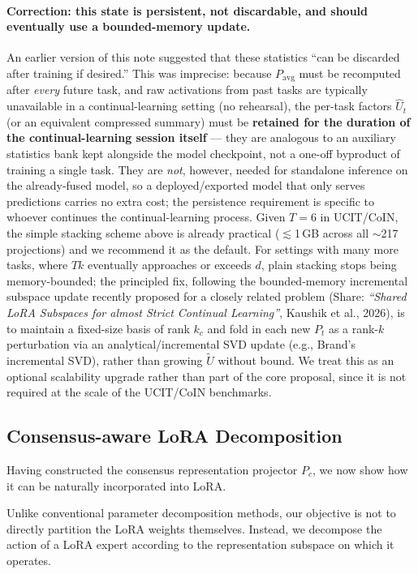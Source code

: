 \documentclass[a4paper]{article}
\begin{document}
\paragraph{Correction: this state is persistent, not discardable, and should eventually use a bounded-memory update.} An earlier version of this note suggested that these statistics ``can be discarded after training if desired.'' This was imprecise: because $P_{\mathrm{avg}}$ must be recomputed after \emph{every} future task, and raw activations from past tasks are typically unavailable in a continual-learning setting (no rehearsal), the per-task factors $\hat U_t$ (or an equivalent compressed summary) must be \textbf{retained for the duration of the continual-learning session itself} — they are analogous to an auxiliary statistics bank kept alongside the model checkpoint, not a one-off byproduct of training a single task. They are \emph{not}, however, needed for standalone inference on the already-fused model, so a deployed/exported model that only serves predictions carries no extra cost; the persistence requirement is specific to whoever continues the continual-learning process. Given $T{=}6$ in UCIT/CoIN, the simple stacking scheme above is already practical ($\lesssim$1\,GB across all $\sim$217 projections) and we recommend it as the default. For settings with many more tasks, where $Tk$ eventually approaches or exceeds $d$, plain stacking stops being memory-bounded; the principled fix, following the bounded-memory incremental subspace update recently proposed for a closely related problem (Share: \emph{``Shared LoRA Subspaces for almost Strict Continual Learning''}, Kaushik et al., 2026), is to maintain a fixed-size basis of rank $k_c$ and fold in each new $P_{t}$ as a rank-$k$ perturbation via an analytical/incremental SVD update (e.g., Brand's incremental SVD), rather than growing $\tilde U$ without bound. We treat this as an optional scalability upgrade rather than part of the core proposal, since it is not required at the scale of the UCIT/CoIN benchmarks.

\subsection{Consensus-aware LoRA Decomposition}

Having constructed the consensus representation projector $P_c$, we now show how it can be naturally incorporated into LoRA.

Unlike conventional parameter decomposition methods, our objective is not to directly partition the LoRA weights themselves. Instead, we decompose the action of a LoRA expert according to the representation subspace on which it operates.
\end{document}
